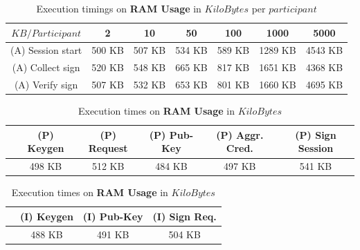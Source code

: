 \documentclass[twocolumn]{article}
\begin{document}
\begin{table}[h!]
  \begin{center}
    \caption{Execution timings on \textbf{RAM Usage} in $KiloBytes$ per $participant$}
      \label{tab:table1}
        \begin{tabular} {c|c|c|c|c|c|c}
          \toprule
           \textbf{$KB / Participant$} & \textbf{2} & \textbf{10} & \textbf{50} & \textbf{100} & \textbf{1000} & \textbf{5000} \\
          \midrule
            (A) Session start & 500 KB & 507 KB & 534 KB & 589 KB & 1289 KB & 4543 KB \\	
            (A) Collect sign & 520 KB & 548 KB & 665 KB & 817 KB & 1651 KB & 4368 KB	\\		
            (A) Verify sign & 507 KB & 532 KB & 653 KB & 801 KB & 1660 KB & 4695 KB	\\
      \bottomrule %
    \end{tabular}
  \end{center}
\end{table}


\begin{table}[h!]
  \begin{center}
    \caption{Execution times on \textbf{RAM Usage} in $KiloBytes$}
      \label{tab:table1}
        \begin{tabular} {c|c|c|c|c|c}
          \toprule
         & \textbf{(P) Keygen} & \textbf{(P) Request} & \textbf{(P) Pub-Key} & \textbf{(P) Aggr. Cred.} & \textbf{(P) Sign Session} \\
          \midrule
 			& 498 KB	&  512 KB	&  484 KB	&  497 KB	&  541 KB	\\


      \bottomrule %
    \end{tabular}
  \end{center}
\end{table}

\begin{table}[h!]
  \begin{center}
    \caption{Execution times on \textbf{RAM Usage} in $KiloBytes$}
      \label{tab:table1}
        \begin{tabular} {c|c|c|c}
          \toprule
          &  \textbf{(I) Keygen}& \textbf{(I) Pub-Key}& \textbf{(I) Sign Req.} \\
          \midrule
				&	488 KB	&  491 KB	&  504 KB	\\
      \bottomrule %
    \end{tabular}
  \end{center}
\end{table}
\end{document}
